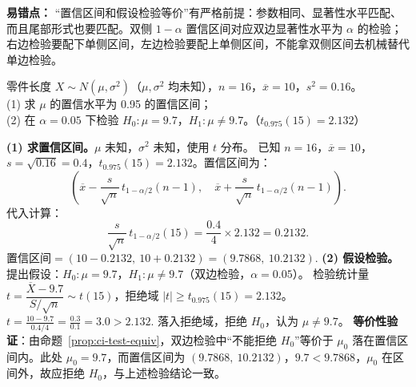 \documentclass[lang=cn,11pt]{elegantbook}
\begin{document}
\begin{note}
\textbf{易错点：} “置信区间和假设检验等价”有严格前提：参数相同、显著性水平匹配、而且尾部形式也要匹配。双侧 \(1-\alpha\) 置信区间对应双边显著性水平为 \(\alpha\) 的检验；右边检验要配下单侧区间，左边检验要配上单侧区间，不能拿双侧区间去机械替代单边检验。
\end{note}

\begin{exercise}\label{exer:9-ci-test}
零件长度 \(X \sim N(\mu, \sigma^2)\)（\(\mu, \sigma^2\) 均未知），\(n=16\)，\(\overline{x}=10\)，\(s^2=0.16\)。\\
(1) 求 \(\mu\) 的置信水平为 0.95 的置信区间；\\
(2) 在 \(\alpha=0.05\) 下检验 \(H_0\colon \mu=9.7\)，\(H_1\colon \mu\neq9.7\)。（\(t_{0.975}(15)=2.132\)）
\end{exercise}
\begin{solution}
\textbf{(1) 求置信区间。}\(\mu\) 未知，\(\sigma^2\) 未知，使用 \(t\) 分布。
已知 \(n=16\)，\(\overline{x}=10\)，\(s=\sqrt{0.16}=0.4\)，\(t_{0.975}(15)=2.132\)。置信区间为：
\[
\left(\overline{x} - \frac{s}{\sqrt{n}}\,t_{1-\alpha/2}(n{-}1),\quad \overline{x} + \frac{s}{\sqrt{n}}\,t_{1-\alpha/2}(n{-}1)\right).
\]
代入计算：
\[
\frac{s}{\sqrt{n}}\,t_{1-\alpha/2}(15) = \frac{0.4}{4}\times2.132 = 0.2132.
\]
\(
\text{置信区间} = (10-0.2132,\ 10+0.2132) = (9.7868,\ 10.2132).
\)
\textbf{(2) 假设检验。}提出假设：\(H_0\colon \mu=9.7\)，\(H_1\colon \mu\neq9.7\)（双边检验，\(\alpha=0.05\)）。
检验统计量 \(t = \dfrac{\overline{X}-9.7}{S/\sqrt{n}} \sim t(15)\)，拒绝域 \(|t| \geq t_{0.975}(15)=2.132\)。
\(
t = \frac{10-9.7}{0.4/4} = \frac{0.3}{0.1} = 3.0 > 2.132.
\)
落入拒绝域，拒绝 \(H_0\)，认为 \(\mu\neq9.7\)。
\textbf{等价性验证}：由命题~\ref{prop:ci-test-equiv}，双边检验中“不能拒绝 \(H_0\)”等价于 \(\mu_0\) 落在置信区间内。此处 \(\mu_0=9.7\)，而置信区间为 \((9.7868,\ 10.2132)\)，\(9.7 < 9.7868\)，\(\mu_0\) 在区间外，故应拒绝 \(H_0\)，与上述检验结论一致。
\end{solution}
\end{document}
